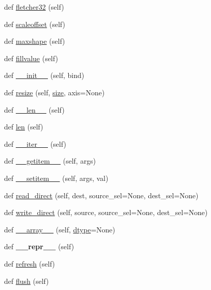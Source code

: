 \begin{DoxyCompactItemize}
def \hyperlink{classh5py__LOCAL_1_1__hl_1_1dataset_1_1Dataset_a4e86ec148b6033a52b46147b5343c7d1}{fletcher32} (self)
\item 
def \hyperlink{classh5py__LOCAL_1_1__hl_1_1dataset_1_1Dataset_a43968f88f601d828dacfee2cb7875238}{scaleoffset} (self)
\item 
def \hyperlink{classh5py__LOCAL_1_1__hl_1_1dataset_1_1Dataset_a9221c71cac7a3b277c442901e1aab900}{maxshape} (self)
\item 
def \hyperlink{classh5py__LOCAL_1_1__hl_1_1dataset_1_1Dataset_a838340b0b7197399d5365a91a09316ce}{fillvalue} (self)
\item 
def \hyperlink{classh5py__LOCAL_1_1__hl_1_1dataset_1_1Dataset_a05ccdf7e6ce8d01f08da87bf3b409ad9}{\+\_\+\+\_\+init\+\_\+\+\_\+} (self, bind)
\item 
def \hyperlink{classh5py__LOCAL_1_1__hl_1_1dataset_1_1Dataset_af5c662f8e5c654847e40e526c8566944}{resize} (self, \hyperlink{classh5py__LOCAL_1_1__hl_1_1dataset_1_1Dataset_abab8b512c27f8a2ffb310aaf45868ac3}{size}, axis=None)
\item 
def \hyperlink{classh5py__LOCAL_1_1__hl_1_1dataset_1_1Dataset_aafa9d582867bbe0d4f4387265cc7baf5}{\+\_\+\+\_\+len\+\_\+\+\_\+} (self)
\item 
def \hyperlink{classh5py__LOCAL_1_1__hl_1_1dataset_1_1Dataset_a523856449c04daa8c3dd06b610f51fef}{len} (self)
\item 
def \hyperlink{classh5py__LOCAL_1_1__hl_1_1dataset_1_1Dataset_ad78768536bed7195da9b74025bac0435}{\+\_\+\+\_\+iter\+\_\+\+\_\+} (self)
\item 
def \hyperlink{classh5py__LOCAL_1_1__hl_1_1dataset_1_1Dataset_ac4b96e81d1b75d9a3702428e496ab502}{\+\_\+\+\_\+getitem\+\_\+\+\_\+} (self, args)
\item 
def \hyperlink{classh5py__LOCAL_1_1__hl_1_1dataset_1_1Dataset_ad038305ebf6ba5d0defad4f883d07ec8}{\+\_\+\+\_\+setitem\+\_\+\+\_\+} (self, args, val)
\item 
def \hyperlink{classh5py__LOCAL_1_1__hl_1_1dataset_1_1Dataset_a576e575a57acdb535a8d61796cf3cdb8}{read\+\_\+direct} (self, dest, source\+\_\+sel=None, dest\+\_\+sel=None)
\item 
def \hyperlink{classh5py__LOCAL_1_1__hl_1_1dataset_1_1Dataset_ae7495d283ad12e1512df702ea8f9dc83}{write\+\_\+direct} (self, source, source\+\_\+sel=None, dest\+\_\+sel=None)
\item 
def \hyperlink{classh5py__LOCAL_1_1__hl_1_1dataset_1_1Dataset_a3cdb6da698b875e92720e23cba41d843}{\+\_\+\+\_\+array\+\_\+\+\_\+} (self, \hyperlink{classh5py__LOCAL_1_1__hl_1_1dataset_1_1Dataset_aa5b8786745cb0e1a0027a5268c67b497}{dtype}=None)
\item 
\mbox{\label{classh5py__LOCAL_1_1__hl_1_1dataset_1_1Dataset_a4991e22eb2038044498e2a91aa0bacf9}} 
def {\bfseries \+\_\+\+\_\+repr\+\_\+\+\_\+} (self)
\item 
def \hyperlink{classh5py__LOCAL_1_1__hl_1_1dataset_1_1Dataset_a96cf84977c113470bbe4afe95cbf9053}{refresh} (self)
\item 
def \hyperlink{classh5py__LOCAL_1_1__hl_1_1dataset_1_1Dataset_a7fd0818fbce609222cc332155abd8441}{flush} (self)
\end{DoxyCompactItemize}
